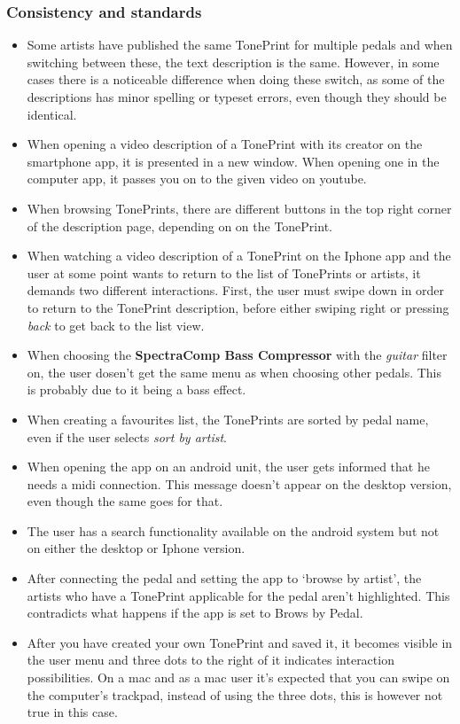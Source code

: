\subsubsection{Consistency and standards}
\begin{itemize}
	\item Some artists have published the same TonePrint for multiple pedals and when switching between these, the text description is the same. However, in some cases there is a noticeable difference when doing these switch, as some of the descriptions has minor spelling or typeset errors, even though they should be identical.\\
	\item When opening a video description of a TonePrint with its creator on the smartphone app, it is presented in a new window. When opening one in the computer app, it passes you on to the given video on youtube. \\
	\item When browsing TonePrints, there are different buttons in the top right corner of the description page, depending on on the TonePrint.\\
	\item When watching a video description of a TonePrint on the Iphone app and the user at some point wants to return to the list of TonePrints or artists, it demands two different interactions. First, the user must swipe down in order to return to the TonePrint description, before either swiping right or pressing \textit{back} to get back to the list view.\\
	\item When choosing the \textbf{SpectraComp Bass Compressor} with the \textit{guitar} filter on, the user dosen't get the same menu as when choosing other pedals. This is probably due to it being a bass effect.\\
	\item When creating a favourites list, the TonePrints are sorted by pedal name, even if the user selects \textit{sort by artist}.\\
	\item When opening the app on an android unit, the user gets informed that he needs a midi connection. This message doesn't appear on the desktop version, even though the same goes for that.\\
	\item The user has a search functionality available on the android system but not on either the desktop or Iphone version.\\
	\item After connecting the pedal and setting the app to ‘browse by artist’, the artists who have a TonePrint applicable for the pedal aren’t highlighted. This contradicts what happens if the app is set to Brows by Pedal.\\
	\item After you have created your own TonePrint and saved it, it becomes visible in the user menu and three dots to the right of it indicates interaction possibilities. On a mac and as a mac user it’s expected that you can swipe on the computer’s trackpad, instead of using the three dots, this is however not true in this case. 
\end{itemize}
%
